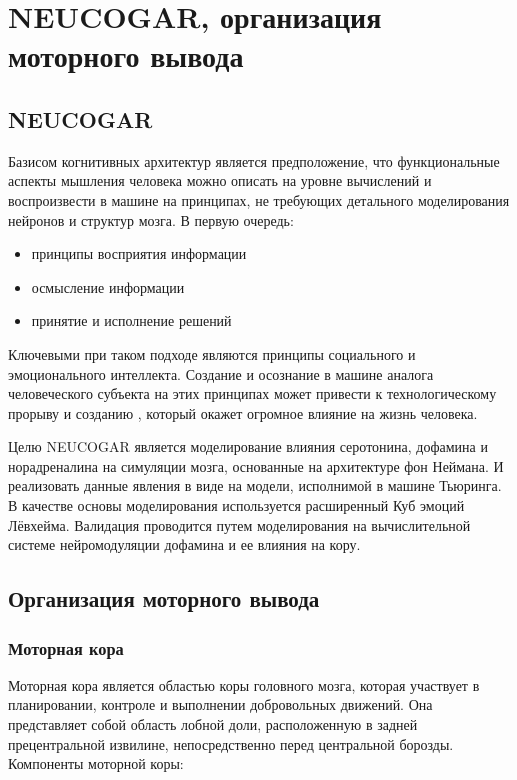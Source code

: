 \chapter{NEUCOGAR, организация моторного вывода}
\label{chap:literature_review}

\section{NEUCOGAR}
Базисом когнитивных архитектур является предположение, что функциональные аспекты мышления человека можно описать на уровне вычислений и воспроизвести в машине на принципах, не требующих детального моделирования нейронов и структур мозга. 
В первую очередь: 
\begin{itemize}
	\item принципы восприятия информации
	\item осмысление информации
	\item принятие и исполнение решений
\end{itemize}

Ключевыми при таком подходе являются принципы социального и эмоционального интеллекта.
Создание и осознание в машине аналога человеческого субъекта на этих принципах может привести к технологическому прорыву и созданию , который окажет огромное влияние на жизнь человека.

Целю NEUCOGAR является моделирование влияния серотонина, дофамина и норадреналина на симуляции мозга, основанные на архитектуре фон Неймана. 
И реализовать данные явления в виде на модели, исполнимой в машине Тьюринга. В качестве основы моделирования используется расширенный Куб эмоций Лёвхейма. Валидация проводится путем моделирования на вычислительной системе нейромодуляции дофамина и ее влияния на кору.


\section{Организация моторного вывода}
\label{section:motor_things}
\subsection{Моторная кора}
Моторная кора является областью коры головного мозга, которая участвует в планировании, контроле и выполнении добровольных движений. 
Она представляет собой область лобной доли, расположенную в задней прецентральной извилине, непосредственно перед центральной борозды.~\cite{wiki:motor}
Компоненты моторной коры:

